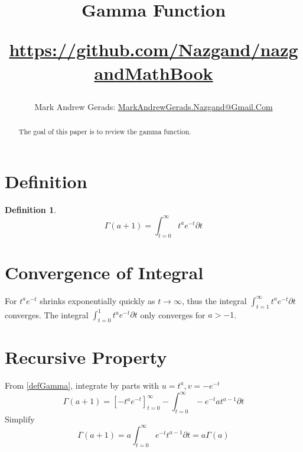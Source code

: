 \documentclass[]{article}
\author{Mark Andrew Gerads: \href{MailTo:MarkAndrewGerads.Nazgand@Gmail.Com}{MarkAndrewGerads.Nazgand@Gmail.Com}}
\title{
	Gamma Function
	
	\href{https://github.com/Nazgand/nazgandMathBook}{https://github.com/Nazgand/nazgandMathBook}
}
\newcommand{\pqty}[1]{{\left(#1\right)}}
\newcommand{\bqty}[1]{{\left[#1\right]}}
\newtheorem{definition}[theorem]{Definition}
\numberwithin{equation}{section}
\begin{document}
	
	\maketitle
	
	\begin{abstract}
		The goal of this paper is to review the gamma function.
	\end{abstract}
	
	\section{Definition}
	\begin{definition}
		\begin{equation}
		\label{defGamma}
		\Gamma\pqty{a+1}=\int_{t=0}^\infty t^a e^{-t} \partial t
		\end{equation}
	\end{definition}
	
	\section{Convergence of Integral}
	For \(t^a e^{-t}\) shrinks exponentially quickly as \(t\to\infty\), thus the integral \(\int_{t=1}^\infty t^a e^{-t} \partial t\) converges.
	The integral \(\int_{t=0}^1 t^a e^{-t} \partial t\) only converges for \(a>-1\).
	
	\section{Recursive Property}
	From \eqref{defGamma}, integrate by parts with \(u=t^a, v=-e^{-t}\)
	\begin{equation}
	\Gamma\pqty{a+1}=\bqty{-t^ae^{-t}}_{t=0}^\infty - 
	\int_{t=0}^\infty -e^{-t}at^{a-1} \partial t
	\end{equation}
	Simplify
	\begin{equation}
	\Gamma\pqty{a+1}= 
	a\int_{t=0}^\infty e^{-t}t^{a-1} \partial t= 
	a\Gamma\pqty{a}
	\end{equation}
\end{document}
